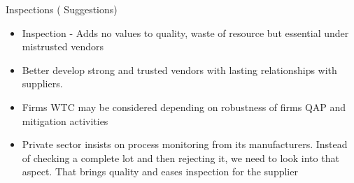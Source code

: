 \documentclass[
  10pt,
  ignorenonframetext,
  aspectratio=43,
]{beamer}
\begin{document}
\begin{frame}{Inspections ( Suggestions)}
\protect\hypertarget{inspections-suggestions}{}
\begin{itemize}
\item
  Inspection - Adds no values to quality, waste of resource but
  essential under mistrusted vendors
\item
  Better develop strong and trusted vendors with lasting relationships
  with suppliers.
\item
  Firms WTC may be considered depending on robustness of firms QAP and
  mitigation activities
\item
  Private sector insists on process monitoring from its manufacturers.
  Instead of checking a complete lot and then rejecting it, we need to
  look into that aspect. That brings quality and eases inspection for
  the supplier
\end{itemize}
\end{frame}
\end{document}
